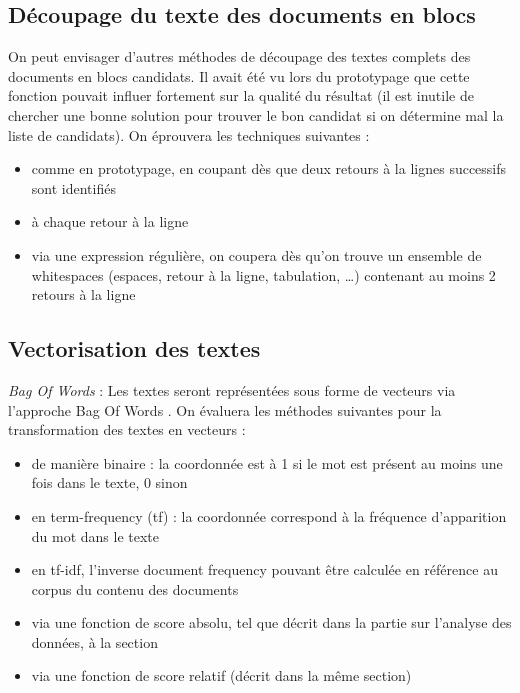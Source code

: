         \subsection{Découpage du texte des documents en blocs}
        \label{splitting_functions}

        On peut envisager d'autres méthodes de découpage des textes complets des documents en blocs candidats.
        Il avait été vu lors du prototypage que cette fonction pouvait influer fortement sur la qualité du résultat (il est inutile de chercher une bonne solution pour trouver le bon candidat si on détermine mal la liste de candidats).
        On éprouvera les techniques suivantes : 
        \begin{itemize}
            \item comme en prototypage, en coupant dès que deux retours à la lignes successifs sont identifiés
            \item à chaque retour à la ligne
            \item via une expression régulière, on coupera dès qu'on trouve un ensemble de whitespaces (espaces, retour à la ligne, tabulation, \dots) contenant au moins 2 retours à la ligne
        \end{itemize}
        
        \subsection{Vectorisation des textes}
        \label{vectorisation}

        \emph{Bag Of Words} : 
        Les textes seront représentées sous forme de vecteurs via l'approche \og Bag Of Words \fg.
        On évaluera les méthodes suivantes pour la transformation des textes en vecteurs :
        \begin{itemize}
            \item de manière binaire : la coordonnée est à 1 si le mot est présent au moins une fois dans le texte, 0 sinon
            \item en term-frequency (tf) : la coordonnée correspond à la fréquence d'apparition du mot dans le texte
            \item en tf-idf, l'inverse document frequency pouvant être calculée en référence au corpus du contenu des documents
            \item via une fonction de score absolu, tel que décrit dans la partie sur l'analyse des données, à la section 
            \item via une fonction de score relatif (décrit dans la même section)
        \end{itemize}
        
